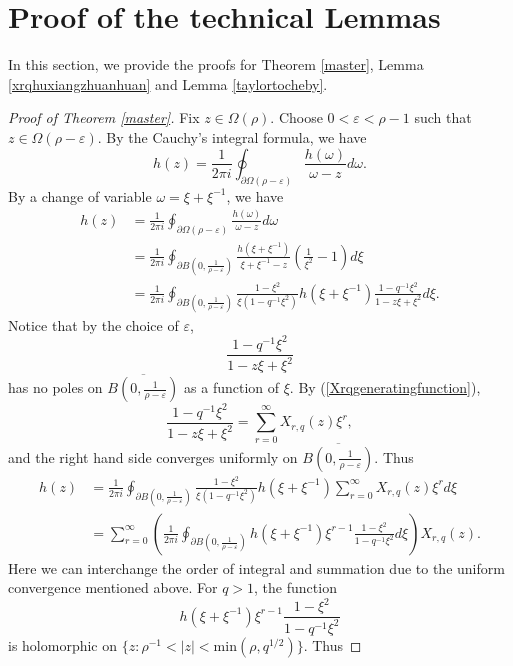 \documentclass{article}
\begin{document}
\section{Proof of the technical Lemmas}\label{section:proof}
In this section, we provide the proofs for Theorem \ref{master}, Lemma \ref{xrqhuxiangzhuanhuan}
and Lemma \ref{taylortocheby}.
\begin{proof}[Proof of Theorem \ref{master}]
    Fix $z \in \Omega(\rho)$. Choose $0<\varepsilon<\rho-1$ such that $z \in \Omega(\rho-\varepsilon)$. By the Cauchy's integral formula, we have 
    $$h(z)=\frac{1}{2\pi i}\oint_{\partial \Omega(\rho-\varepsilon)}\frac{h(\omega)}{\omega-z}d\omega.$$
    By a change of variable $\omega=\xi+\xi^{-1}$, we have
    \begin{equation}
        \begin{aligned}
    h(z)&=\frac{1}{2\pi i}\oint_{\partial \Omega(\rho-\varepsilon)}\frac{h(\omega)}{\omega-z}d\omega\\
    &=\frac{1}{2\pi i}\oint_{\partial B(0, \frac{1}{\rho-\varepsilon})}\frac{h(\xi+\xi^{-1})}{\xi+\xi^{-1}-z}(\frac{1}{\xi^2}-1)d\xi\\
    &=\frac{1}{2\pi i}\oint_{\partial B(0, \frac{1}{\rho-\varepsilon})} \frac{1-\xi^2}{\xi(1-q^{-1}\xi^2)} h(\xi+\xi^{-1}) \frac{1-q^{-1}\xi^2}{1-z\xi+\xi^2}d\xi.
\end{aligned}
    \end{equation}
    Notice that by the choice of $\varepsilon$, 
    $$\frac{1-q^{-1}\xi^2}{1-z\xi+\xi^2}$$ has no poles on $\overline{ B(0, \frac{1}{\rho-\varepsilon})}$ as a function of $\xi$. By (\ref{Xrqgeneratingfunction}), 
    $$\frac{1-q^{-1}\xi^2}{1-z\xi+\xi^2}=\sum_{r=0}^{\infty}X_{r,q}(z)\xi^r,$$
    and the right hand side converges uniformly on $\overline{ B(0, \frac{1}{\rho-\varepsilon})}$. Thus 
    $$
    \begin{aligned}
    h(z)&=\frac{1}{2\pi i}\oint_{\partial B(0, \frac{1}{\rho-\varepsilon})} \frac{1-\xi^2}{\xi(1-q^{-1}\xi^2)} h(\xi+\xi^{-1}) \sum_{r=0}^{\infty}X_{r,q}(z) \xi^r d\xi\\
    &=\sum_{r=0}^{\infty} \left( \frac{1}{2\pi i}\oint_{\partial B(0, \frac{1}{\rho-\varepsilon})} h(\xi+\xi^{-1})\xi^{r-1}\frac{1-\xi^2}{1-q^{-1}\xi^2}d\xi \right) X_{r,q}(z).
\end{aligned}$$
Here we can interchange the order of integral and summation due to the uniform convergence mentioned above.
For $q>1$, the function 
$$h(\xi+\xi^{-1})\xi^{r-1}\frac{1-\xi^2}{1-q^{-1}\xi^2}$$ is holomorphic on $\{z:\rho^{-1}<|z|<\mathrm{min}(\rho, q^{1/2}) \}$. Thus 

\end{proof}
\end{document}
